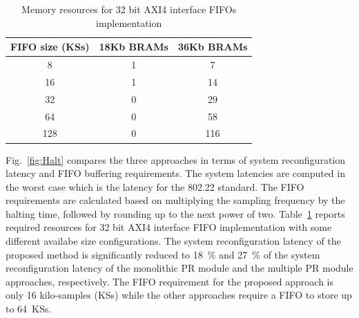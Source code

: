 \begin{table}[hb]
	\centering
	\caption{Memory resources for 32 bit AXI4 interface FIFOs implementation}
	\label{tab:FIFOResouces}
	\begin{tabular}{c|c|c}
        \hline \hline
    			  FIFO size (KSs)&  18Kb BRAMs  & 36Kb BRAMs \\
	\hline
		8			& 1	&  7 \\
		16			& 1	&  14  \\
		32			& 0 	&  29 \\
		64	  		& 0  & 58 \\
		128	  		& 0	 & 116 \\
	\hline \hline
    \end{tabular}
\end{table}
Fig.~\ref{fig:Halt} compares the three approaches in terms of system reconfiguration latency and FIFO buffering requirements. The system latencies are computed in the worst case which is the latency for the 802.22 standard. The FIFO requirements are calculated based on multiplying the sampling frequency by the halting time, followed by rounding up to the next power of two.  Table~\ref{tab:FIFOResouces} reports
required resources for 32 bit AXI4 interface FIFO implementation with some different availabe size configurations.
The system reconfiguration latency of the proposed method is significantly reduced to 18~\% and 27~\% of the system reconfiguration latency of the monolithic PR module and the multiple PR module approaches, respectively. The FIFO requirement for the proposed approach is only 16 kilo-samples (KSs) while the other approaches require a FIFO to store up to 64~KSs.

